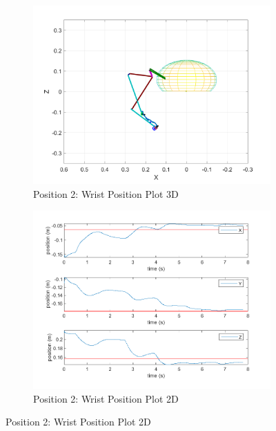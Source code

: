 \begin{figure}[ht]
    \begin{subfigure}[b]{0.45\textwidth}
        \includegraphics[width=0.8\linewidth]{Pictures/Controller/QSC/13_wp.png}
        \caption{Position 2: Wrist Position Plot 3D}
    \end{subfigure}%
    \hfill
    \begin{subfigure}[b]{0.45\textwidth}
        \includegraphics[width=0.8\linewidth]{Pictures/Controller/QSC/13.png}
        \caption{Position 2: Wrist Position Plot 2D}
    \end{subfigure}

    \vspace{2pt} %


\end{figure}
